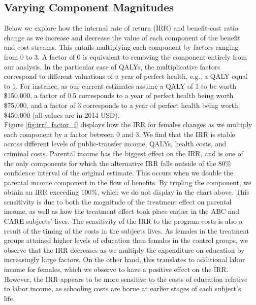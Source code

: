 \subsection{Varying Component Magnitudes}
\label{app:sa_factors}

\noindent Below we explore how the internal rate of return (IRR) and benefit-cost ratio change as
we increase and decrease the value of each component of the benefit and cost streams. This entails
multiplying each component by factors ranging from 0 to 3. A factor of 0 is equivalent
to removing the component entirely from our analysis. In the particular
case of QALYs, the multiplicative factors correspond to different valuations of a year of perfect
health, e.g., a QALY equal to 1. For instance, as our current estimates assume a QALY of 1 to be worth
\$150,000, a factor of 0.5 corresponds to a year of perfect health being
worth \$75,000, and a factor of 3 corresponds to a year of perfect health
being worth \$450,000 (all values are in 2014 USD). \\

\noindent Figure \ref{fig:irrf_factor_f} displays how the IRR for females
changes as we multiply each component by a factor between 0 and 3. We find that the IRR
is stable across different levels of public-transfer income, QALYs, health costs, and criminal 
costs. Parental income has the biggest effect on the IRR, 
and is one of the only components for which the alternative IRR falls outside of the 80\% confidence 
interval of the original estimate. This occurs when we double the parental income component in the
flow of benefits. By tripling the component, we obtain an IRR exceeding 100\%, which we
do not display in the chart above. This sensitivity is due to both the magnitude of the
treatment effect on parental income, as well as how the treatment effect took place
earlier in the ABC and CARE subjects' lives. The sensitivity of the IRR to the program costs
is also a result of the timing of the costs in the subjects lives. As females in the treatment groups attained higher levels of education
than females in the control groups, we observe that the IRR decreases as we multiply the
expenditure on education by increasingly large factors. On the other hand, this translates
to additional labor income for females, which we observe to have a positive effect on the
IRR. However, the IRR appears to be more sensitive to the costs of education relative
to labor income, as schooling costs are borne at earlier stages of each subject's life. 


